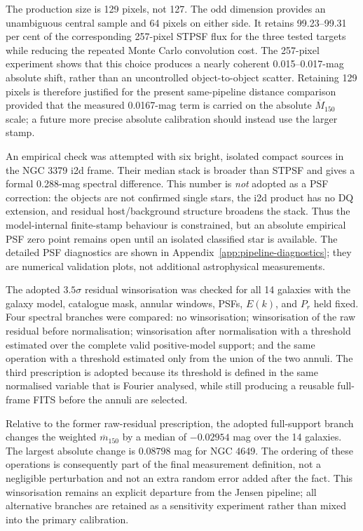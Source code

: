 \documentclass[nodoi,nocopyright]{pas}
\newcommand{\mbar}{\overline{m}}
\newcommand{\Mbar}{\overline{M}}
\begin{document}
The production size is 129 pixels, not 127. The odd dimension provides an
unambiguous central sample and 64 pixels on either side. It retains
99.23--99.31 per cent of the corresponding 257-pixel STPSF flux for the three
tested targets while reducing the repeated Monte Carlo convolution cost. The
257-pixel experiment shows that this choice produces a nearly coherent
0.015--0.017-mag absolute shift, rather than an uncontrolled object-to-object
scatter. Retaining 129 pixels is therefore justified for the present
same-pipeline distance comparison provided that the measured 0.0167-mag term
is carried on the absolute $\Mbar_{150}$ scale; a future more precise absolute
calibration should instead use the larger stamp.

An empirical check was attempted with six bright, isolated compact sources in
the NGC 3379 i2d frame. Their median stack is broader than STPSF and gives a
formal 0.288-mag spectral difference. This number is \emph{not} adopted as a
PSF correction: the objects are not confirmed single stars, the i2d product
has no DQ extension, and residual host/background structure broadens the
stack. Thus the model-internal finite-stamp behaviour is constrained, but an absolute
empirical PSF zero point remains open until an isolated classified star is
available. The detailed PSF diagnostics are shown in
Appendix~\ref{app:pipeline-diagnostics}; they are numerical validation plots,
not additional astrophysical measurements.

The adopted $3.5\sigma$ residual winsorisation was checked for all 14 galaxies
with the galaxy model, catalogue mask, annular windows, PSFs, $E(k)$, and
$P_r$ held fixed.  Four spectral branches were compared: no winsorisation;
winsorisation of the raw residual before normalisation; winsorisation after
normalisation with a threshold estimated over the complete valid
positive-model support; and the same operation with a threshold estimated
only from the union of the two annuli.  The third prescription is adopted
because its threshold is defined in the same normalised variable that is
Fourier analysed, while still producing a reusable full-frame FITS before the
annuli are selected.

Relative to the former raw-residual prescription, the adopted full-support
branch changes the weighted $\mbar_{150}$ by a median of $-0.02954$ mag over
the 14 galaxies.  The largest absolute change is $0.08798$ mag for NGC 4649.
The ordering of these operations is consequently part of the final
measurement definition, not a negligible perturbation and not an extra random
error added after the fact.  This winsorisation remains an explicit departure
from the Jensen pipeline; all alternative branches are retained as a
sensitivity experiment rather than mixed into the primary calibration.
\end{document}
